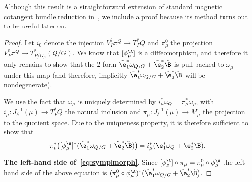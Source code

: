 Although this result is a straightforward extension of standard magnetic cotangent bundle reduction in~\cite{MarsdenHamRed}, we include a proof because its method turns out to be useful later on.
\begin{proof}
Let $i_0$ denote the injection $V^0_P\pi^Q\to T^*_PQ$ and $\pi_\mu^0$ the projection $V^0_P\pi^Q\to T^*_{P/G_\mu}(Q/G)$. We know that $[\phi_\mu^\A]$ is a dif\/feomorphism, and therefore it only remains to show that the 2-form $\tilde\e_1^*\omega_{Q/G} + \tilde\e_2^*\tilde\B$ is pull-backed to $\omega_\mu$ under this map (and therefore, implicitly $\tilde\e_1^*\omega_{Q/G} + \tilde\e_2^*\tilde\B$ will be nondegenerate).

We use the fact that $\omega_\mu$ is uniquely determined by $i^*_\mu\omega_Q=\pi^*_\mu\omega_\mu$, with $i_\mu:J^{-1}_\delta(\mu)\to T_P^*Q$ the natural inclusion and $\pi_\mu:J^{-1}_\delta(\mu)\to M_\mu$ the projection to the quotient space. Due to the uniqueness property, it is therefore suf\/f\/icient to show that \begin{gather}\label{eq:symplmorph}
\pi^*_\mu\big([\phi_\mu^\A]^*(\tilde\e_1^*\omega_{Q/G} + \tilde\e_2^*\tilde\B)\big)=i^*_\mu(\e_1^*\omega_Q+\e^*_2\B).
\end{gather}

{\bf The left-hand side of~\eqref{eq:symplmorph}.} Since $[\phi_\mu^\A]\circ\pi_\mu = \pi^0_\mu\circ\phi_\mu^\A$ the left-hand side of the above equation is $(\pi^0_\mu\circ\phi_\mu^\A)^*\big(\tilde\e_1^*\omega_{Q/G} + \tilde\e_2^*\tilde\B\big)$.


\end{proof}

